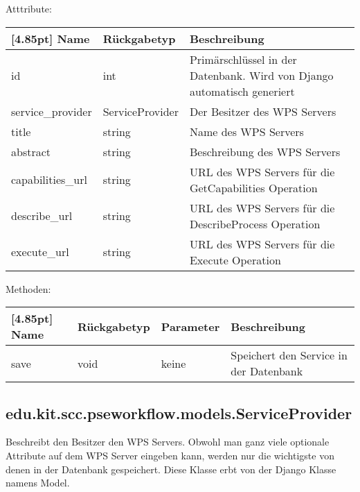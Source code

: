 			Atttribute:
			\begin{center}
				\setlength\tabcolsep{5pt}
				\renewcommand{\arraystretch}{1.5}
				
				\begin{tabularx}{\textwidth}{|l|l|X|}
					\hline
					\rowcolor[gray]{0.75}[4.85pt]
					Name & Rückgabetyp & Beschreibung \\ \hline 
					id & int & Primärschlüssel in der Datenbank. Wird von Django automatisch generiert \\ \hline
					service\_provider & ServiceProvider & Der Besitzer des WPS Servers \\ \hline
					title & string & Name des WPS Servers \\ \hline
					abstract & string & Beschreibung des WPS Servers \\ \hline
					capabilities\_url & string & URL des WPS Servers für die GetCapabilities Operation \\ \hline
					describe\_url & string & URL des WPS Servers für die DescribeProcess Operation \\ \hline
					execute\_url & string & URL des WPS Servers für die Execute Operation \\ \hline
					
				\end{tabularx}
			\end{center}
			
			Methoden:
			\begin{center}
				\setlength\tabcolsep{5pt}
				\renewcommand{\arraystretch}{1.5}
				
				\begin{tabularx}{\textwidth}{|l|l|l|X|}
					\hline
					\rowcolor[gray]{0.75}[4.85pt]
					Name & Rückgabetyp & Parameter & Beschreibung \\ \hline 
					save & void & keine & Speichert den Service in der Datenbank \\
					\hline
				\end{tabularx}
			\end{center}

        \subsection{edu.kit.scc.pseworkflow.models.ServiceProvider}
			Beschreibt den Besitzer den WPS Servers. Obwohl man ganz viele optionale Attribute auf dem WPS Server eingeben kann, werden nur die wichtigste von denen in der Datenbank gespeichert. \newline
			Diese Klasse erbt von der Django Klasse namens \glqq Model\grqq .
			
